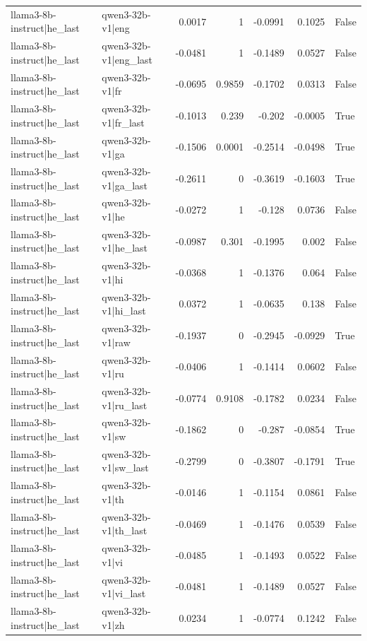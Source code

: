 \begin{table}
\begin{tabular}{l l r r r r l}
llama3-8b-instruct|he_last & qwen3-32b-v1|eng & 0.0017 & 1 & -0.0991 & 0.1025 & False \\
llama3-8b-instruct|he_last & qwen3-32b-v1|eng_last & -0.0481 & 1 & -0.1489 & 0.0527 & False \\
llama3-8b-instruct|he_last & qwen3-32b-v1|fr & -0.0695 & 0.9859 & -0.1702 & 0.0313 & False \\
llama3-8b-instruct|he_last & qwen3-32b-v1|fr_last & -0.1013 & 0.239 & -0.202 & -0.0005 & True \\
llama3-8b-instruct|he_last & qwen3-32b-v1|ga & -0.1506 & 0.0001 & -0.2514 & -0.0498 & True \\
llama3-8b-instruct|he_last & qwen3-32b-v1|ga_last & -0.2611 & 0 & -0.3619 & -0.1603 & True \\
llama3-8b-instruct|he_last & qwen3-32b-v1|he & -0.0272 & 1 & -0.128 & 0.0736 & False \\
llama3-8b-instruct|he_last & qwen3-32b-v1|he_last & -0.0987 & 0.301 & -0.1995 & 0.002 & False \\
llama3-8b-instruct|he_last & qwen3-32b-v1|hi & -0.0368 & 1 & -0.1376 & 0.064 & False \\
llama3-8b-instruct|he_last & qwen3-32b-v1|hi_last & 0.0372 & 1 & -0.0635 & 0.138 & False \\
llama3-8b-instruct|he_last & qwen3-32b-v1|raw & -0.1937 & 0 & -0.2945 & -0.0929 & True \\
llama3-8b-instruct|he_last & qwen3-32b-v1|ru & -0.0406 & 1 & -0.1414 & 0.0602 & False \\
llama3-8b-instruct|he_last & qwen3-32b-v1|ru_last & -0.0774 & 0.9108 & -0.1782 & 0.0234 & False \\
llama3-8b-instruct|he_last & qwen3-32b-v1|sw & -0.1862 & 0 & -0.287 & -0.0854 & True \\
llama3-8b-instruct|he_last & qwen3-32b-v1|sw_last & -0.2799 & 0 & -0.3807 & -0.1791 & True \\
llama3-8b-instruct|he_last & qwen3-32b-v1|th & -0.0146 & 1 & -0.1154 & 0.0861 & False \\
llama3-8b-instruct|he_last & qwen3-32b-v1|th_last & -0.0469 & 1 & -0.1476 & 0.0539 & False \\
llama3-8b-instruct|he_last & qwen3-32b-v1|vi & -0.0485 & 1 & -0.1493 & 0.0522 & False \\
llama3-8b-instruct|he_last & qwen3-32b-v1|vi_last & -0.0481 & 1 & -0.1489 & 0.0527 & False \\
llama3-8b-instruct|he_last & qwen3-32b-v1|zh & 0.0234 & 1 & -0.0774 & 0.1242 & False \\

\end{tabular}
\end{table}
